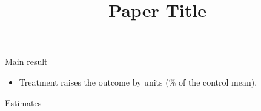 \documentclass[12pt]{beamer}
\title{Paper Title}
\author{}
\date{}
\begin{document}
\maketitle

\begin{frame}{Main result}
\begin{itemize}
  \item Treatment raises the outcome by  units
        (\% of the control mean).
\end{itemize}
\end{frame}

\begin{frame}{Estimates}
\centering
{}
\end{frame}
\end{document}
